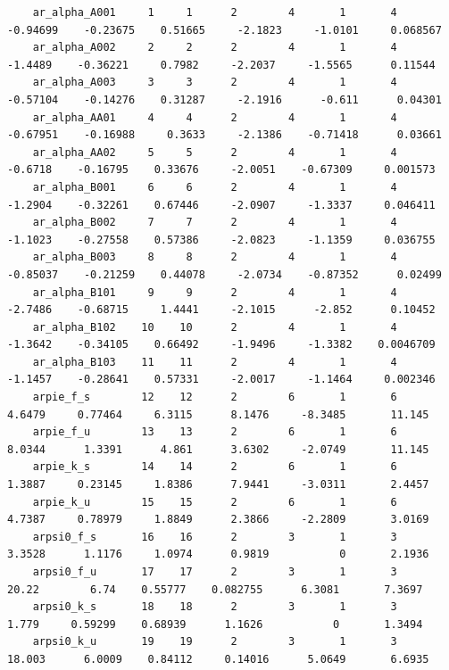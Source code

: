 \documentclass[
]{book}
\begin{document}
\begin{verbatim}
    ar_alpha_A001     1     1      2        4       1       4      -0.94699    -0.23675    0.51665     -2.1823     -1.0101     0.068567
    ar_alpha_A002     2     2      2        4       1       4       -1.4489    -0.36221     0.7982     -2.2037     -1.5565      0.11544
    ar_alpha_A003     3     3      2        4       1       4      -0.57104    -0.14276    0.31287     -2.1916      -0.611      0.04301
    ar_alpha_AA01     4     4      2        4       1       4      -0.67951    -0.16988     0.3633     -2.1386    -0.71418      0.03661
    ar_alpha_AA02     5     5      2        4       1       4       -0.6718    -0.16795    0.33676     -2.0051    -0.67309     0.001573
    ar_alpha_B001     6     6      2        4       1       4       -1.2904    -0.32261    0.67446     -2.0907     -1.3337     0.046411
    ar_alpha_B002     7     7      2        4       1       4       -1.1023    -0.27558    0.57386     -2.0823     -1.1359     0.036755
    ar_alpha_B003     8     8      2        4       1       4      -0.85037    -0.21259    0.44078     -2.0734    -0.87352      0.02499
    ar_alpha_B101     9     9      2        4       1       4       -2.7486    -0.68715     1.4441     -2.1015      -2.852      0.10452
    ar_alpha_B102    10    10      2        4       1       4       -1.3642    -0.34105    0.66492     -1.9496     -1.3382    0.0046709
    ar_alpha_B103    11    11      2        4       1       4       -1.1457    -0.28641    0.57331     -2.0017     -1.1464     0.002346
    arpie_f_s        12    12      2        6       1       6        4.6479     0.77464     6.3115      8.1476     -8.3485       11.145
    arpie_f_u        13    13      2        6       1       6        8.0344      1.3391      4.861      3.6302     -2.0749       11.145
    arpie_k_s        14    14      2        6       1       6        1.3887     0.23145     1.8386      7.9441     -3.0311       2.4457
    arpie_k_u        15    15      2        6       1       6        4.7387     0.78979     1.8849      2.3866     -2.2809       3.0169
    arpsi0_f_s       16    16      2        3       1       3        3.3528      1.1176     1.0974      0.9819           0       2.1936
    arpsi0_f_u       17    17      2        3       1       3         20.22        6.74    0.55777    0.082755      6.3081       7.3697
    arpsi0_k_s       18    18      2        3       1       3         1.779     0.59299    0.68939      1.1626           0       1.3494
    arpsi0_k_u       19    19      2        3       1       3        18.003      6.0009    0.84112     0.14016      5.0649       6.6935


\end{verbatim}
\end{document}
